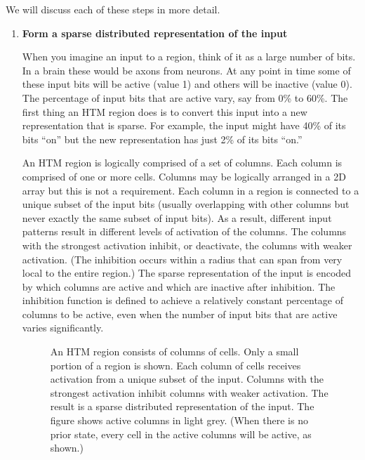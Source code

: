 \documentclass{report}
\begin{document}
We will discuss each of these steps in more detail.

\begin{enumerate}
\item {\bf Form a sparse distributed representation of the input}

When you imagine an input to a region, think of it as a large number
of bits. In a brain these would be axons from neurons. At any point in
time some of these input bits will be active (value 1) and others will
be inactive (value 0). The percentage of input bits that are active
vary, say from 0\% to 60\%. The first thing an HTM region does is to
convert this input into a new representation that is sparse. For
example, the input might have 40\% of its bits ``on'' but the new
representation has just 2\% of its bits ``on.''

An HTM region is logically comprised of a set of columns. Each column
is comprised of one or more cells. Columns may be logically arranged
in a 2D array but this is not a requirement. Each column in a region
is connected to a unique subset of the input bits (usually overlapping
with other columns but never exactly the same subset of input
bits). As a result, different input patterns result in different
levels of activation of the columns. The columns with the strongest
activation inhibit, or deactivate, the columns with weaker
activation. (The inhibition occurs within a radius that can span from
very local to the entire region.) The sparse representation of the
input is encoded by which columns are active and which are inactive
after inhibition. The inhibition function is defined to achieve a
relatively constant percentage of columns to be active, even when the
number of input bits that are active varies significantly.

\begin{figure}
\caption{An HTM region consists of columns of cells. Only a small
  portion of a region is shown. Each column of cells receives
  activation from a unique subset of the input. Columns with the
  strongest activation inhibit columns with weaker activation. The
  result is a sparse distributed representation of the input. The
  figure shows active columns in light grey. (When there is no prior
  state, every cell in the active columns will be active, as shown.)}
\label{figure:region-columns}
\end{figure}


\end{enumerate}
\end{document}
